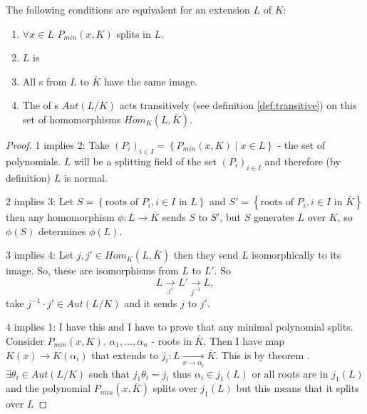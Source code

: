 \begin{theorem}
  The following conditions are equivalent for an extension $L$ of $K$:
  \begin{enumerate}
  \item $\forall x \in L$ $P_{min}\left(x, K\right)$ splits in $L$.
  \item $L$ is 
  \item All s from $L$ to $\bar{K}$ have the
    same image.
  \item The  of s
    $Aut\left(L/K\right)$ acts transitively (see definition
    \ref{def:transitive}) on this set of 
    homomorphisms $Hom_K\left(L, \bar{K}\right)$.
  \end{enumerate}
  \begin{proof}
    1 implies 2: Take
    $\left(P_i\right)_{i \in I} = \left\{P_{min}\left(x, K\right) \mid
    x \in L\right\}$ - the set of polynomials.
    $L$ will be a splitting field of the set $\left(P_i\right)_{i \in
      I}$ and therefore (by definition) $L$ is normal.

    2 implies 3: Let
    $S = \left\{\mbox{roots of } P_i, i \in I \mbox{ in } L\right\}$
    and
    $S' = \left\{\mbox{roots of } P_i, i \in I \mbox{ in }
    \bar{K}\right\}$ then any homomorphism
    $\phi: L \to \bar{K}$ sends $S$ to $S'$, but $S$ generates $L$
    over $K$, so $\phi\left(S\right)$ determines $\phi\left(L\right)$.

    3 implies 4: Let $j, j' \in Hom_K\left(L, \bar{K}\right)$ then
    they send $L$ isomorphically to its image. So, these are
    isomorphisms from $L$ to $L'$. So
    \[
    L \xrightarrow[j']{} L' \xrightarrow[j^{-1}]{} L,
    \]
    take $j^{-1} \cdot j' \in Aut \left(L/K\right)$ and it sends $j$
    to $j'$.

    4 implies 1:  I have this  and I have to prove
    that any minimal polynomial splits. Consider
    $P_{min}\left(x, K\right)$. $\alpha_1, \dots, \alpha_n$ - roots in
    $\bar{K}$. Then I have map $K\left(x\right) \to
    K\left(\alpha_i\right)$ that extends to
    $j_i: L \xrightarrow[x \to \alpha_i]{} \bar{K}$. This is by
    theorem .
    $\exists \theta_i \in Aut\left(L/K\right)$ such that
    $j_1 \theta_i = j_i$ thus
    $\alpha_i \in j_1\left(L\right)$ or all roots are in
    $j_1\left(L\right)$ and the polynomial
    $P_{min}\left(x, \bar{K}\right)$ splits over $j_1\left(L\right)$
    but this means that it splits over $L$    
  \end{proof}
  \label{thm:lec5_3}
\end{theorem}

